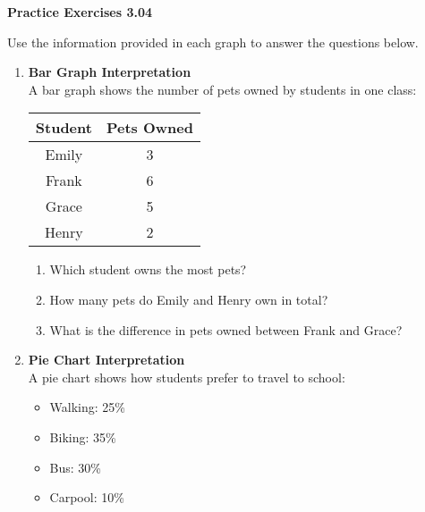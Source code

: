 \vspace{0.3ex}
\noindent\textbf{Practice Exercises 3.04}

\vspace{0.2ex}

Use the information provided in each graph to answer the questions below.

\begin{enumerate}[label=\color{blue}\arabic*.]
    \item \textbf{Bar Graph Interpretation} \\
    A bar graph shows the number of pets owned by students in one class:

    \begin{center}
    \begin{tabular}{|c|c|}
        \hline
        \textbf{Student} & \textbf{Pets Owned} \\
        \hline
        Emily & 3 \\
        Frank & 6 \\
        Grace & 5 \\
        Henry & 2 \\
        \hline
    \end{tabular}
    \end{center}



    \begin{enumerate}[label=(\alph*)]
        \item Which student owns the most pets?
        \item How many pets do Emily and Henry own in total?
        \item What is the difference in pets owned between Frank and Grace?
    \end{enumerate}

    \item \textbf{Pie Chart Interpretation} \\
    A pie chart shows how students prefer to travel to school:
    
    \begin{itemize}
        \item Walking: 25\%
        \item Biking: 35\%
        \item Bus: 30\%
        \item Carpool: 10\%
    \end{itemize}
    

\end{enumerate}
